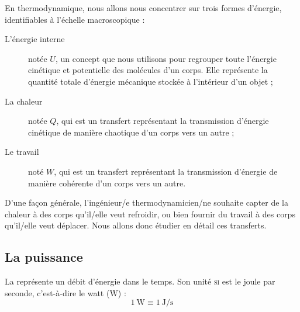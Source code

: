 		En thermodynamique, nous allons nous concentrer sur trois formes d’énergie, identifiables à l’échelle macroscopique :
		
		\begin{description}
			\item [L’énergie interne] notée $U$, un concept que nous utilisons pour regrouper toute l’énergie cinétique et potentielle des molécules d’un corps. Elle représente la quantité totale d’énergie mécanique stockée à l’intérieur d’un objet ;
			\item [La chaleur] notée $Q$, qui est un transfert représentant la transmission d’énergie cinétique de manière chaotique d’un corps vers un autre ;
			\item [Le travail] noté $W$, qui est un transfert représentant la transmission d’énergie de manière cohérente d’un corps vers un autre.
		\end{description}

		D’une façon générale, l’ingénieur/e thermodynamicien/ne souhaite capter de la chaleur à des corps qu’il/elle veut refroidir, ou bien fournir du travail à des corps qu’il/elle veut déplacer. Nous allons donc étudier en détail ces transferts.
	
	\subsection{La puissance}

		La  représente un débit d’énergie dans le temps. Son unité \textsc{si} est le \si{joule} \si{par} \si{seconde}, c’est-à-dire le \si{watt} (\si{\watt}) :
		\begin{equation}
		\SI{1}{\watt} \equiv \SI{1}{\joule\per\second}
		\label{def_puissance}
		\end{equation}

